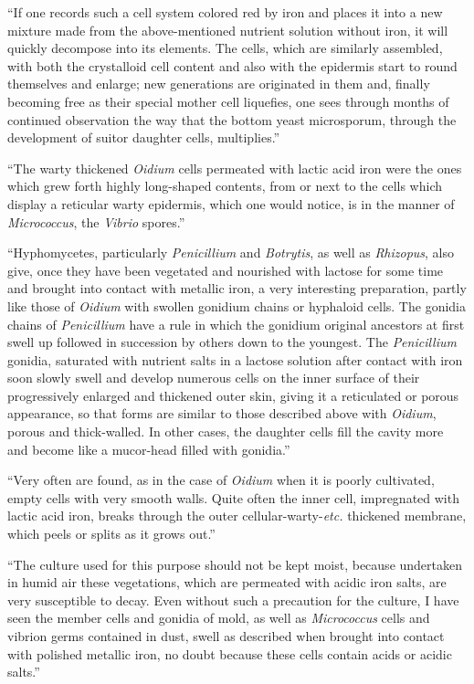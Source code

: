 \documentclass[a4paper, 12pt, oneside]{article}
\begin{document}
``If one records such a cell system colored red by iron and places it into a new mixture made from the above-mentioned nutrient solution without iron, it will quickly decompose into its elements. The cells, which are similarly assembled, with both the crystalloid cell content and also with the epidermis start to round themselves and enlarge; new generations are originated in them and, finally becoming free as their special mother cell liquefies, one sees through months of continued observation the way that the bottom yeast microsporum, through the development of suitor daughter cells, multiplies.''

``The warty thickened \emph{Oidium} cells permeated with lactic acid iron were the ones which grew forth highly long-shaped contents, from or next to the cells which display a reticular warty epidermis, which one would notice, is in the manner of \emph{Micrococcus}, the \emph{Vibrio} spores.''

``Hyphomycetes, particularly \emph{Penicillium} and \emph{Botrytis}, as well as \emph{Rhizopus}, also give, once they have been vegetated and nourished with lactose for some time and brought into contact with metallic iron, a very interesting preparation, partly like those of \emph{Oidium} with swollen gonidium chains or hyphaloid cells. The gonidia chains of \emph{Penicillium} have a rule in which the gonidium original ancestors at first swell up followed in succession by others down to the youngest. The \emph{Penicillium} gonidia, saturated with nutrient salts in a lactose solution after contact with iron soon slowly swell and develop numerous cells on the inner surface of their progressively enlarged and thickened outer skin, giving it a reticulated or porous appearance, so that forms are similar to those described above with \emph{Oidium}, porous and thick-walled. In other cases, the daughter cells fill the cavity more and become like a mucor-head filled with gonidia.''

``Very often are found, as in the case of \emph{Oidium} when it is poorly cultivated, empty cells with very smooth walls. Quite often the inner cell, impregnated with lactic acid iron, breaks through the outer cellular-warty-\emph{etc.} thickened membrane, which peels or splits as it grows out.''

``The culture used for this purpose should not be kept moist, because undertaken in humid air these vegetations, which are permeated with acidic iron salts, are very susceptible to decay. Even without such a precaution for the culture, I have seen the member cells and gonidia of mold, as well as \emph{Micrococcus} cells and vibrion germs contained in dust, swell as described when brought into contact with polished metallic iron, no doubt because these cells contain acids or acidic salts.''
\end{document}

